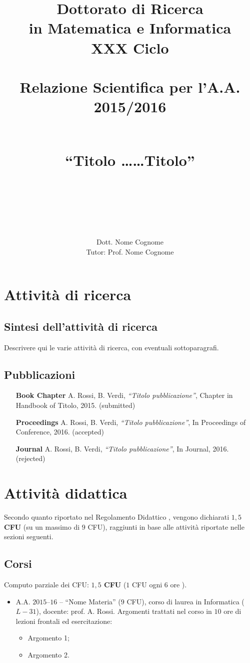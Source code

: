 \documentclass[a4paper,12pt]{article}
\title{Dottorato di Ricerca \\
in Matematica e Informatica \\
XXX Ciclo \\
\ \\
Relazione Scientifica per l'A.A. 2015/2016\\
\ \\
\begin{small}
    \textbf{``Titolo \dots \linebreak \dots Titolo}''
\end{small} \\
\ \\
}
\author{Dott. Nome Cognome \\ Tutor: Prof. Nome Cognome}
\begin{document}
\maketitle
\newpage

\tableofcontents
\newpage

\section{Attivit\`{a} di ricerca}

\subsection{Sintesi dell'attivit\`{a} di ricerca}\label{subsec:sintesiricerca}

Descrivere qui le varie attivit\`{a} di ricerca, con eventuali sottoparagrafi.


\subsection{Pubblicazioni}\label{subsec:pubs}
\begin{itemize}
    \item[\textbf{Book Chapter}] A. Rossi, B. Verdi, \textit{``Titolo pubblicazione''}, Chapter in Handbook of Titolo, 2015. (submitted)
    \item[\textbf{Proceedings}] A. Rossi, B. Verdi, \textit{``Titolo pubblicazione''}, In Proceedings of Conference, 2016. (accepted)
    \item[\textbf{Journal}] A. Rossi, B. Verdi, \textit{``Titolo pubblicazione''}, In Journal, 2016. (rejected)
\end{itemize}


\section{Attivit\`{a} didattica}
Secondo quanto riportato nel Regolamento Didattico \cite{regolamento}, vengono dichiarati \textbf{$1,5$ CFU} (su un massimo di $9$ CFU), raggiunti in base alle attività riportate nelle sezioni seguenti.

\subsection{Corsi}
Computo parziale dei CFU: \textbf{$1,5$ CFU} ($1$ CFU ogni $6$ ore \cite{regolamento}).
\begin{itemize}
    \item A.A. $2015$--$16$ -- ``Nome Materia'' ($9$ CFU), corso di laurea in Informatica ($L-31$), docente: prof. A. Rossi. Argomenti trattati nel corso in $10$ ore di lezioni frontali ed esercitazione:
    \begin{itemize}
        \item Argomento 1;
        \item Argomento 2.
    \end{itemize}
\end{itemize}
\end{document}
